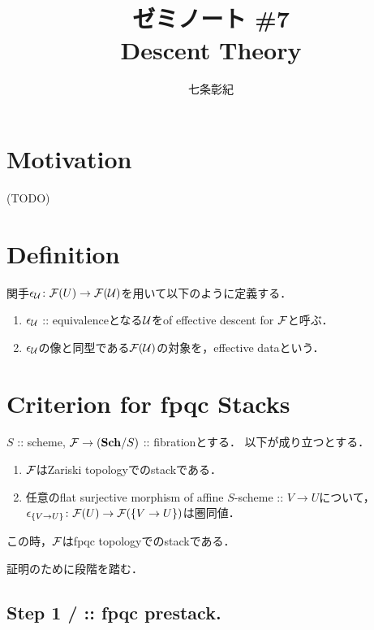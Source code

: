 \documentclass[a4paper]{jsarticle}
\begin{document}
\title{ゼミノート \#7 \\ Descent Theory}
\author{七条彰紀}
\maketitle

\section{Motivation}
    (TODO)

\section{Definition}
\begin{Def}
    関手$\epsilon_{\mathcal{U}} \colon \mathcal{F}(U) \to \mathcal{F}(\mathcal{U})$を用いて以下のように定義する．
    \begin{enumerate}[label=(\roman*)]
        \item
            $\epsilon_{\mathcal{U}}$ :: equivalenceとなる$\mathcal{U}$をof effective descent for $\mathcal{F}$と呼ぶ．
        \item
            $\epsilon_{\mathcal{U}}$の像と同型である$\mathcal{F}(\mathcal{U})$の対象を，effective dataという．
    \end{enumerate}
\end{Def}

\section{Criterion for fpqc Stacks}
\begin{Lemma}
    $S$ :: scheme,
    $\mathcal{F} \to (\mathbf{Sch}/S)$ :: fibrationとする．
    以下が成り立つとする．
    \begin{enumerate}[label=(\alph*)]
        \item $\mathcal{F}$はZariski topologyでのstackである．
        \item
            任意のflat surjective morphism of affine $S$-scheme :: $V \to U$について，\mnewline
            $\epsilon_{\{V \to U\}} \colon \mathcal{F}(U) \to \mathcal{F}(\{V \to U\})$は圏同値．
    \end{enumerate}
    この時，$\mathcal{F}$はfpqc topologyでのstackである．
\end{Lemma}

証明のために段階を踏む．
\subsection{Step 1 /  :: fpqc prestack.}
\end{document}
